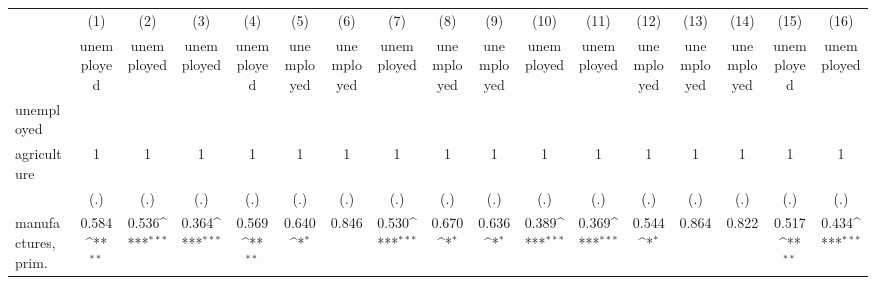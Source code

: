 {
\def\sym#1{\ifmmode^{#1}\else\(^{#1}\)\fi}
\begin{tabular}{l*{16}{c}}
\hline\hline
                    &\multicolumn{1}{c}{(1)}&\multicolumn{1}{c}{(2)}&\multicolumn{1}{c}{(3)}&\multicolumn{1}{c}{(4)}&\multicolumn{1}{c}{(5)}&\multicolumn{1}{c}{(6)}&\multicolumn{1}{c}{(7)}&\multicolumn{1}{c}{(8)}&\multicolumn{1}{c}{(9)}&\multicolumn{1}{c}{(10)}&\multicolumn{1}{c}{(11)}&\multicolumn{1}{c}{(12)}&\multicolumn{1}{c}{(13)}&\multicolumn{1}{c}{(14)}&\multicolumn{1}{c}{(15)}&\multicolumn{1}{c}{(16)}\\
                    &\multicolumn{1}{c}{unemployed}&\multicolumn{1}{c}{unemployed}&\multicolumn{1}{c}{unemployed}&\multicolumn{1}{c}{unemployed}&\multicolumn{1}{c}{unemployed}&\multicolumn{1}{c}{unemployed}&\multicolumn{1}{c}{unemployed}&\multicolumn{1}{c}{unemployed}&\multicolumn{1}{c}{unemployed}&\multicolumn{1}{c}{unemployed}&\multicolumn{1}{c}{unemployed}&\multicolumn{1}{c}{unemployed}&\multicolumn{1}{c}{unemployed}&\multicolumn{1}{c}{unemployed}&\multicolumn{1}{c}{unemployed}&\multicolumn{1}{c}{unemployed}\\
\hline
unemployed          &                     &                     &                     &                     &                     &                     &                     &                     &                     &                     &                     &                     &                     &                     &                     &                     \\
agriculture         &           1         &           1         &           1         &           1         &           1         &           1         &           1         &           1         &           1         &           1         &           1         &           1         &           1         &           1         &           1         &           1         \\
                    &         (.)         &         (.)         &         (.)         &         (.)         &         (.)         &         (.)         &         (.)         &         (.)         &         (.)         &         (.)         &         (.)         &         (.)         &         (.)         &         (.)         &         (.)         &         (.)         \\
[1em]
manufactures, prim. &       0.584\sym{**} &       0.536\sym{***}&       0.364\sym{***}&       0.569\sym{**} &       0.640\sym{*}  &       0.846         &       0.530\sym{***}&       0.670\sym{*}  &       0.636\sym{*}  &       0.389\sym{***}&       0.369\sym{***}&       0.544\sym{*}  &       0.864         &       0.822         &       0.517\sym{**} &       0.434\sym{***}\\

\end{tabular}}

